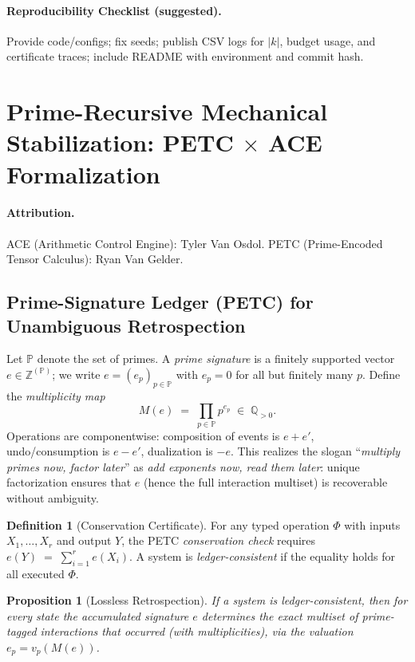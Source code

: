 \documentclass[11pt]{article}
\theoremstyle{plain}
\newtheorem{proposition}[theorem]{Proposition}
\theoremstyle{definition}
\newtheorem{definition}[theorem]{Definition}
\theoremstyle{remark}
\begin{document}
\paragraph{Reproducibility Checklist (suggested).} Provide code/configs; fix seeds; publish CSV logs for $|k|$, budget usage, and certificate traces; include README with environment and commit hash.

\section{Prime-Recursive Mechanical Stabilization: PETC \texorpdfstring{$\times$}{x} ACE Formalization}
\label{sec:pirtm_formal}

\paragraph{Attribution.}
\textsc{ACE} (Arithmetic Control Engine): Tyler Van Osdol. \;
\textsc{PETC} (Prime-Encoded Tensor Calculus): Ryan Van Gelder.

\subsection{Prime-Signature Ledger (PETC) for Unambiguous Retrospection}
Let $\mathbb{P}$ denote the set of primes. A \emph{prime signature} is a finitely supported vector
$e \in \mathbb{Z}^{(\mathbb{P})}$; we write $e=(e_p)_{p \in \mathbb{P}}$ with $e_p=0$ for all but finitely many $p$.
Define the \emph{multiplicity map}
\[
  M(e) \;=\; \prod_{p\in\mathbb{P}} p^{e_p} \;\in\; \mathbb{Q}_{>0}.
\]
Operations are componentwise: composition of events is $e+e'$, undo/consumption is $e-e'$, dualization is $-e$.
This realizes the slogan ``\emph{multiply primes now, factor later}'' as \emph{add exponents now, read them later}:
unique factorization ensures that $e$ (hence the full interaction multiset) is recoverable without ambiguity.

\begin{definition}[Conservation Certificate]
For any typed operation $\Phi$ with inputs $X_1,\dots,X_r$ and output $Y$, the PETC \emph{conservation check} requires
\(
  e(Y) \;=\; \sum_{i=1}^r e(X_i).
\)
A system is \emph{ledger-consistent} if the equality holds for all executed $\Phi$.
\end{definition}

\begin{proposition}[Lossless Retrospection]
If a system is ledger-consistent, then for every state the accumulated signature $e$ determines the exact
multiset of prime-tagged interactions that occurred (with multiplicities), via the valuation $e_p = v_p(M(e))$.
\end{proposition}
\end{document}
